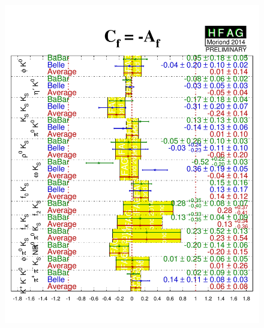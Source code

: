 \begin{figure}[htbp]
\begin{center}
{      \includegraphics{figures/cp_uta/sPengC_CP}
    }
    \\
\end{center}
\end{figure}
